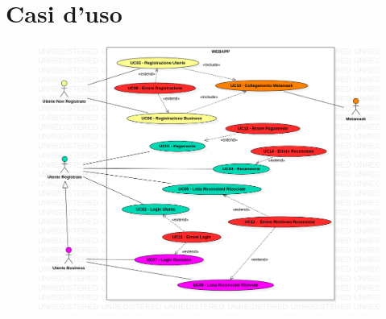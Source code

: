 \section{Casi d'uso}

\begin{figure}[H]
    \centering
    \includegraphics[width=1\textwidth]{use_case/UML_casi.png} 
\end{figure}

